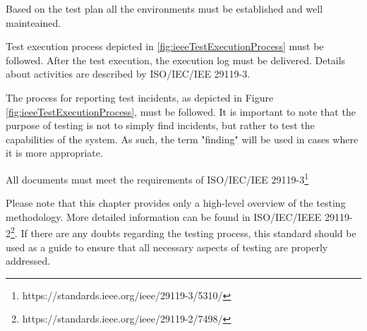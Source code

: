 Based on the test plan all the environments must be established and well mainteained.

Test execution process depicted in \ref{fig:ieeeTestExecutionProcess} must be followed. After the test execution, the execution log must be delivered. Details about activities are described by ISO/IEC/IEE 29119-3.


The process for reporting test incidents, as depicted in Figure \ref{fig:ieeeTestExecutionProcess}, must be followed. It is important to note that the purpose of testing is not to simply find incidents, but rather to test the capabilities of the system. As such, the term "finding" will be used in cases where it is more appropriate.

All documents must meet the requirements of ISO/IEC/IEE 29119-3\footnote[4]{https://standards.ieee.org/ieee/29119-3/5310/}

Please note that this chapter provides only a high-level overview of the testing methodology. More detailed information can be found in ISO/IEC/IEEE 29119-2\footnote[5]{https://standards.ieee.org/ieee/29119-2/7498/}. If there are any doubts regarding the testing process, this standard should be used as a guide to ensure that all necessary aspects of testing are properly addressed.



